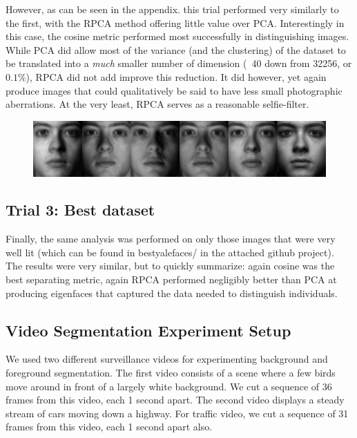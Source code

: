 \documentclass[11pt]{scrartcl} %
\theoremstyle{plain}
\begin{document}
However, as can be seen in the appendix. this trial performed very similarly to the first, with the RPCA method offering little value over PCA. Interestingly in this case, the cosine metric performed most successfully in distinguishing images. While PCA did allow most of the variance (and the clustering) of the dataset to be translated into a \emph{much} smaller  number of dimension (~40 down from 32256, or $0.1\%$), RPCA did not add improve this reduction. It did however, yet again produce images that could qualitatively be said to have less small photographic aberrations. At the very least, RPCA serves as a reasonable selfie-filter.

\begin{figure}[H]
\includegraphics[width=\textwidth]{figures/person24Afterl=0dot005RPCAtrial2.jpg} 
\centering
\end{figure}

\subsection{Trial 3: Best dataset}

Finally, the same analysis was performed on only those images that were very well lit (which can be found in bestyalefaces/ in the attached github project). The results were very similar, but to quickly summarize: again cosine was the best separating metric, again RPCA performed negligibly better than PCA at producing eigenfaces that captured the data needed to distinguish individuals. 

\subsection{Video Segmentation Experiment Setup}

We used two different surveillance videos for experimenting background and foreground segmentation. The first video consists of a scene where a few birds move around in front of a largely white background. We cut a sequence of 36 frames from this video, each 1 second apart. The second video  displays a steady stream of cars moving down a highway. For traffic video, we cut a sequence of 31 frames from this video, each 1 second apart also. 
\end{document}
